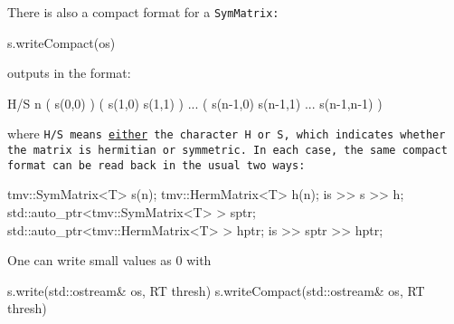 There is also a compact format for a \tt{SymMatrix}:
\begin{tmvcode}
s.writeCompact(os)
\end{tmvcode}
outputs in the format:
\begin{tmvcode}
H/S n 
( s(0,0) )
( s(1,0)  s(1,1) )
...
( s(n-1,0)  s(n-1,1) ... s(n-1,n-1) )
\end{tmvcode}
where \tt{H/S} means \underline{either} the character \tt{H} or \tt{S}, which indicates whether 
the matrix is hermitian or symmetric.
In each case, the same compact format can be read back in the usual two ways:
\begin{tmvcode}
tmv::SymMatrix<T> s(n);
tmv::HermMatrix<T> h(n);
is >> s >> h;
std::auto_ptr<tmv::SymMatrix<T> > sptr;
std::auto_ptr<tmv::HermMatrix<T> > hptr;
is >> sptr >> hptr;
\end{tmvcode}
One can write small values as 0 with
\begin{tmvcode}
s.write(std::ostream& os, RT thresh)
s.writeCompact(std::ostream& os, RT thresh)
\end{tmvcode}

